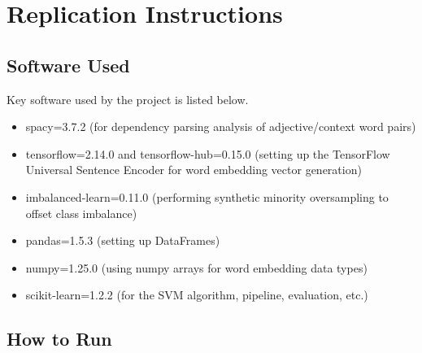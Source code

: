 \documentclass[10pt,twocolumn]{article}
\begin{document}
\appendix

\section{Replication Instructions}

\subsection{Software Used}
Key software used by the project is listed below.

\begin{itemize}
\item spacy=3.7.2 (for dependency parsing analysis of adjective/context word pairs)
\item tensorflow=2.14.0 and tensorflow-hub=0.15.0 (setting up the TensorFlow Universal Sentence Encoder for word embedding vector generation)
\item imbalanced-learn=0.11.0 (performing synthetic minority oversampling to offset class imbalance)
\item pandas=1.5.3 (setting up DataFrames)
\item numpy=1.25.0 (using numpy arrays for word embedding data types)
\item scikit-learn=1.2.2 (for the SVM algorithm, pipeline, evaluation, etc.)
\end{itemize}

\subsection{How to Run}
\end{document}
